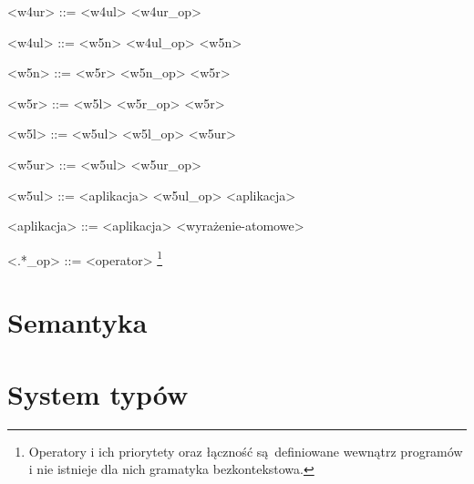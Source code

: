 \documentclass[12pt]{article}
\begin{document}
\begin{grammar}
<w4ur> ::=
    <w4ul>
     <w4ur_op> 
    
<w4ul> ::=
    <w5n>
    \alt <w4ul_op> <w5n>

<w5n> ::=
    <w5r>
     <w5n_op> <w5r>

<w5r> ::=
    <w5l>
     <w5r_op> <w5r>

<w5l> ::=
    <w5ul>
     <w5l_op> <w5ur>

<w5ur> ::=
    <w5ul>
     <w5ur_op>
    
<w5ul> ::=
    <aplikacja>
    \alt <w5ul_op> <aplikacja>

<aplikacja> ::=
    <aplikacja> <wyrażenie-atomowe>

<.*_op> ::= 
    <operator>
    \footnote{
        Operatory i ich priorytety oraz 
        łączność są definiowane wewnątrz programów
        i nie istnieje dla nich gramatyka bezkontekstowa.
    }



\end{grammar}

\section{Semantyka}

\section{System typów}
\end{document}
